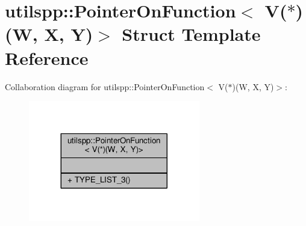 \hypertarget{structutilspp_1_1PointerOnFunction_3_01V_07_5_08_07W_00_01X_00_01Y_08_4}{\section{utilspp\-:\-:Pointer\-On\-Function$<$ V($\ast$)(W, X, Y)$>$ Struct Template Reference}
\label{structutilspp_1_1PointerOnFunction_3_01V_07_5_08_07W_00_01X_00_01Y_08_4}
}


Collaboration diagram for utilspp\-:\-:Pointer\-On\-Function$<$ V($\ast$)(W, X, Y)$>$\-:
\nopagebreak
\begin{figure}[H]
\begin{center}
\leavevmode
\includegraphics[width=212pt]{structutilspp_1_1PointerOnFunction_3_01V_07_5_08_07W_00_01X_00_01Y_08_4__coll__graph}
\end{center}
\end{figure}
